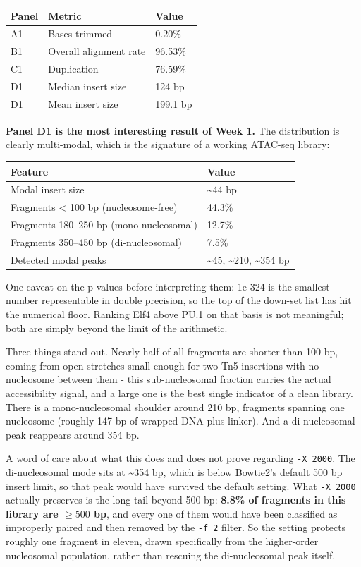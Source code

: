 \documentclass[
  11pt,
  a4paper,
]{article}
\begin{document}
\begin{longtable}[]{@{}lll@{}}
\toprule\noalign{}
Panel & Metric & Value \\
\midrule\noalign{}
\endhead
\bottomrule\noalign{}
\endlastfoot
A1 & Bases trimmed & 0.20\% \\
B1 & Overall alignment rate & 96.53\% \\
C1 & Duplication & 76.59\% \\
D1 & Median insert size & 124 bp \\
D1 & Mean insert size & 199.1 bp \\
\end{longtable}

\textbf{Panel D1 is the most interesting result of Week 1.} The
distribution is clearly multi-modal, which is the signature of a working
ATAC-seq library:

\begin{longtable}[]{@{}ll@{}}
\toprule\noalign{}
Feature & Value \\
\midrule\noalign{}
\endhead
\bottomrule\noalign{}
\endlastfoot
Modal insert size & \textasciitilde44 bp \\
Fragments \textless{} 100 bp (nucleosome-free) & 44.3\% \\
Fragments 180--250 bp (mono-nucleosomal) & 12.7\% \\
Fragments 350--450 bp (di-nucleosomal) & 7.5\% \\
Detected modal peaks & \textasciitilde45, \textasciitilde210,
\textasciitilde354 bp \\
\end{longtable}

One caveat on the p-values before interpreting them: 1e-324 is the
smallest number representable in double precision, so the top of the
down-set list has hit the numerical floor. Ranking Elf4 above PU.1 on
that basis is not meaningful; both are simply beyond the limit of the
arithmetic.

Three things stand out. Nearly half of all fragments are shorter than
100 bp, coming from open stretches small enough for two Tn5 insertions
with no nucleosome between them - this sub-nucleosomal fraction carries
the actual accessibility signal, and a large one is the best single
indicator of a clean library. There is a mono-nucleosomal shoulder
around 210 bp, fragments spanning one nucleosome (roughly 147 bp of
wrapped DNA plus linker). And a di-nucleosomal peak reappears around 354
bp.

A word of care about what this does and does not prove regarding
\texttt{-X\ 2000}. The di-nucleosomal mode sits at \textasciitilde354
bp, which is below Bowtie2's default 500 bp insert limit, so that peak
would have survived the default setting. What \texttt{-X\ 2000} actually
preserves is the long tail beyond 500 bp: \textbf{8.8\% of fragments in
this library are \(\geq 500\) bp}, and every one of them would have been
classified as improperly paired and then removed by the \texttt{-f\ 2}
filter. So the setting protects roughly one fragment in eleven, drawn
specifically from the higher-order nucleosomal population, rather than
rescuing the di-nucleosomal peak itself.
\end{document}
